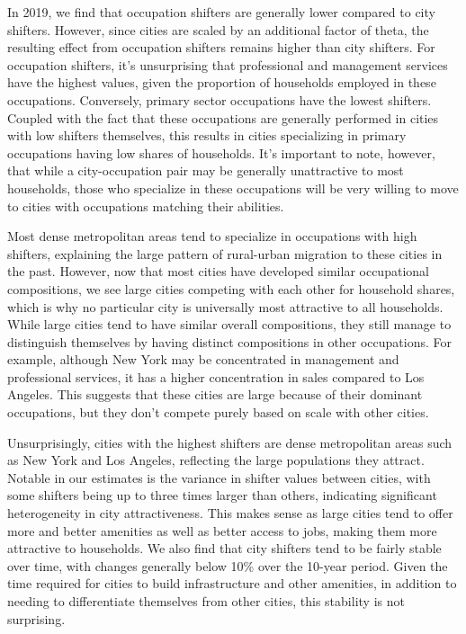 \documentclass[10pt]{article}
\begin{document}
In 2019, we find that occupation shifters are generally lower compared to city shifters. However, since cities are scaled by an additional factor of theta, the resulting effect from occupation shifters remains higher than city shifters. For occupation shifters, it's unsurprising that professional and management services have the highest values, given the proportion of households employed in these occupations. Conversely, primary sector occupations have the lowest shifters. Coupled with the fact that these occupations are generally performed in cities with low shifters themselves, this results in cities specializing in primary occupations having low shares of households. It's important to note, however, that while a city-occupation pair may be generally unattractive to most households, those who specialize in these occupations will be very willing to move to cities with occupations matching their abilities.

Most dense metropolitan areas tend to specialize in occupations with high shifters, explaining the large pattern of rural-urban migration to these cities in the past. However, now that most cities have developed similar occupational compositions, we see large cities competing with each other for household shares, which is why no particular city is universally most attractive to all households. While large cities tend to have similar overall compositions, they still manage to distinguish themselves by having distinct compositions in other occupations. For example, although New York may be concentrated in management and professional services, it has a higher concentration in sales compared to Los Angeles. This suggests that these cities are large because of their dominant occupations, but they don't compete purely based on scale with other cities.

Unsurprisingly, cities with the highest shifters are dense metropolitan areas such as New York and Los Angeles, reflecting the large populations they attract. Notable in our estimates is the variance in shifter values between cities, with some shifters being up to three times larger than others, indicating significant heterogeneity in city attractiveness. This makes sense as large cities tend to offer more and better amenities as well as better access to jobs, making them more attractive to households. We also find that city shifters tend to be fairly stable over time, with changes generally below 10\% over the 10-year period. Given the time required for cities to build infrastructure and other amenities, in addition to needing to differentiate themselves from other cities, this stability is not surprising.
\end{document}
